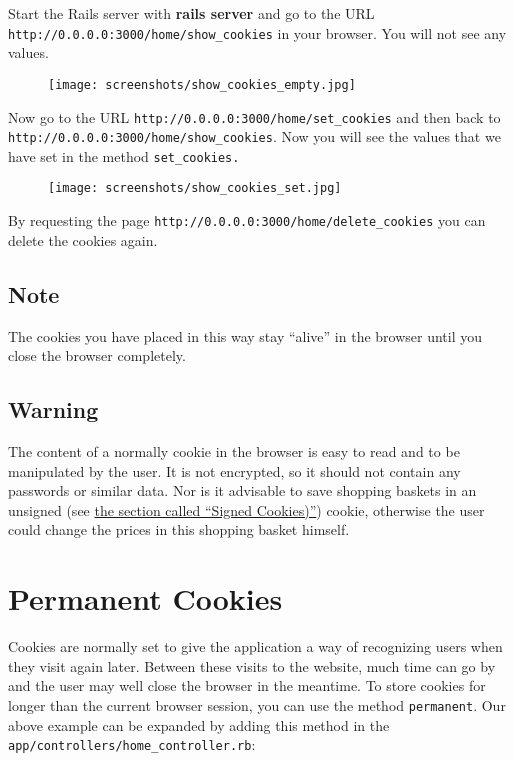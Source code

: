 \documentclass[a4paper]{book}
\begin{document}
Start the Rails server with \textbf{rails server} and go to the URL \texttt{http://0.0.0.0:3000/home/show\_cookies} in your browser. You will not see any values.

\begin{figure}[htbp]
\centering
\texttt{[image: screenshots/show\_cookies\_empty.jpg]}
\end{figure}

Now go to the URL \texttt{http://0.0.0.0:3000/home/set\_cookies} and then back to \texttt{http://0.0.0.0:3000/home/show\_cookies}. Now you will see the values that we have set in the method \texttt{set\_cookies.}

\begin{figure}[htbp]
\centering
\texttt{[image: screenshots/show\_cookies\_set.jpg]}
\end{figure}

By requesting the page \texttt{http://0.0.0.0:3000/home/delete\_cookies} you can delete the cookies again.

\subsection{Note}\label{note-44}

The cookies you have placed in this way stay “alive” in the browser until you close the browser completely.

\subsection{Warning}\label{warning-12}

The content of a normally cookie in the browser is easy to read and to be manipulated by the user. It is not encrypted, so it should not contain any passwords or similar data. Nor is it advisable to save shopping baskets in an unsigned (see \hyperref[cookiesux5fsigned]{the section called “Signed Cookies)”}) cookie, otherwise the user could change the prices in this shopping basket himself.

\section{Permanent Cookies}\label{permanent-cookies}

Cookies are normally set to give the application a way of recognizing users when they visit again later. Between these visits to the website, much time can go by and the user may well close the browser in the meantime. To store cookies for longer than the current browser session, you can use the method \texttt{permanent}. Our above example can be expanded by adding this method in the \texttt{app/controllers/home\_controller.rb}:
\end{document}
